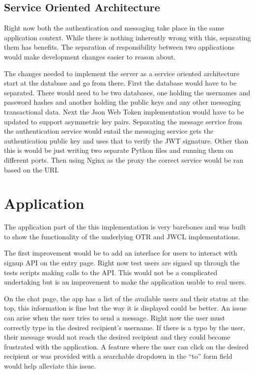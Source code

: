 \subsection{Service Oriented Architecture}


Right now both the authentication and messaging take place in the same application context. While there is nothing inherently wrong with this, separating them has benefits. The separation of responsibility between two applications would make development changes easier to reason about. 


The changes needed to implement the server as a service oriented architecture start at the database and go from there. First the database would have to be separated. There would need to be two databases, one holding the usernames and password hashes and another holding the public keys and any other messaging transactional data. Next the Json Web Token implementation would have to be updated to support asymmetric key pairs. Separating the message service from the authentication service would entail the messaging service gets the authentication public key and uses that to verify the JWT signature. Other than this is would be just writing two separate Python files and running them on different ports. Then using Nginx as the proxy the correct service would be ran based on the URI. 


\section{Application}


The application part of the this implementation is very barebones and was built to show the functionality of the underlying OTR and JWCL implementations. 


The first improvement would be to add an interface for users to interact with signup API on the entry page. Right now test users are signed up through the tests scripts making calls to the API. This would not be a complicated undertaking but is an improvement to make the application usable to real users.


On the chat page, the app has a list of the available users and their status at the top, this information is fine but the way it is displayed could be better. An issue can arise when the user tries to send a message. Right now the user must correctly type in the desired recipient's username. If there is a typo by the user, their message would not reach the desired recipient and they could become frustrated with the application. A feature where the user can click on the desired recipient or was provided with a searchable dropdown in the “to” form field would help alleviate this issue.


